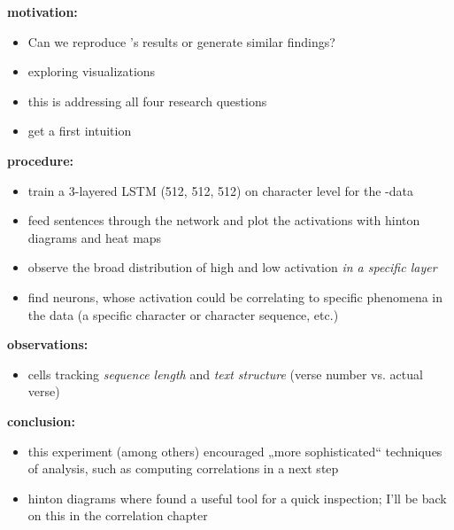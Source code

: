 \begin{frame}{\expi}
	\textbf{motivation:}
	\begin{itemize}
		\item Can we reproduce \citeauthor{karpathy2015visualizing}'s results or generate similar findings?
		\item exploring visualizations
		\item this is addressing all four research questions
		\item get a first intuition
	\end{itemize}
\end{frame}
\begin{frame}{\expi}
	\textbf{procedure:}
	\begin{itemize}
		\item train a 3-layered LSTM (512, 512, 512) on character level for the \kj -data
		\item feed sentences through the network and plot the activations with hinton diagrams and heat maps
		\item observe the broad distribution of high and low activation \textit{in a specific layer} 
		\item find neurons, whose activation could be correlating to specific phenomena in the data (a specific character or character sequence, etc.)
	\end{itemize}
\end{frame}
\begin{frame}{\expi}
	\textbf{observations:}
	\begin{itemize}
		\item cells tracking \textit{sequence length} and \textit{text structure} (verse number vs. actual verse)
	\end{itemize}
	\textbf{conclusion:}
	\begin{itemize}
		\item this experiment (among others) encouraged „more sophisticated“ techniques of analysis, such as computing correlations in a next step
		\item hinton diagrams where found a useful tool for a quick inspection; I'll be back on this in the correlation chapter
	\end{itemize}
\end{frame}